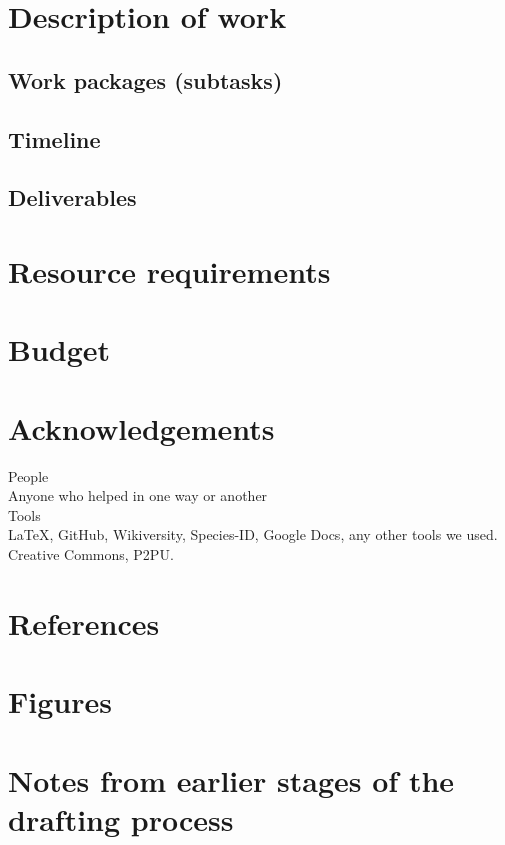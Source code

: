 \documentclass[final,authoryear,3p]{elsarticle-open-drafting}
\begin{document}
\section{Description of work}
\subsection{Work packages (subtasks)}
\subsection{Timeline}
\subsection{Deliverables}

\section{Resource requirements}
\section{Budget}
\section{Acknowledgements}
People\\
Anyone who helped in one way or another\\

Tools\\
\LaTeX, GitHub, Wikiversity, Species-ID, Google Docs, any other tools we used.
Creative Commons, P2PU.

\section{References}

\section{Figures}


\section{Notes from earlier stages of the drafting process}
\end{document}
